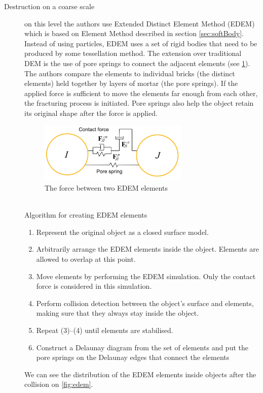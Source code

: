 \begin{description}
\item[Destruction on a coarse scale] on this level the authors use Extended Distinct Element Method (EDEM) which is based on Element Method described in section \ref{sec:softBody}. Instead of using particles, EDEM uses a set of rigid bodies that need to be produced by some tessellation method. The extension over traditional DEM is the use of pore springs to connect the adjacent elements (see \cref{fig:spring}). The authors compare the elements to individual bricks (the distinct elements) held together by layers of mortar (the pore springs). If the applied force is sufficient to move the elements far enough from each other, the fracturing process is initiated. Pore springs also help the object retain its original shape after the force is applied. 
\begin{figure}[t]
        \centering
        \includegraphics[width=0.7\textwidth]{img/spring}
        \caption{The force between two EDEM elements \cite{edem}}
        \label{fig:spring}
\end{figure}
\\Algorithm for creating EDEM elements
\begin{enumerate}
\item Represent the original object as a closed surface model.
\item Arbitrarily arrange the EDEM elements inside the object.
Elements are allowed to overlap at this point.
\item Move elements by performing the EDEM simulation. Only the contact force is considered in this simulation.
\item Perform collision detection between the object’s surface
and elements, making sure that they always
stay inside the object.
\item Repeat (3)–(4) until elements are stabilised.
\item Construct a Delaunay diagram from the set of elements
and put the pore springs on the Delaunay edges that connect
the elements
\end{enumerate}
We can see the distribution of the EDEM elements inside objects after the collision on \cref{fig:edem}.


\end{description}
